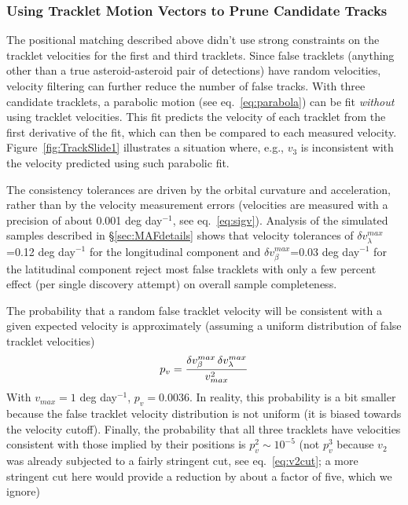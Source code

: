 
\subsubsection{Using Tracklet Motion Vectors to Prune Candidate Tracks}

The positional matching described above didn't use strong constraints on the tracklet velocities
for the first and third tracklets. Since false tracklets (anything other than a true 
asteroid-asteroid pair of detections) have random velocities, 
velocity filtering can further reduce the number of false tracks.
With three candidate tracklets, a parabolic motion (see eq.~\ref{eq:parabola}) can be fit {\it without}
using tracklet velocities. This fit predicts the velocity of each tracklet from the first derivative of
the fit, which can then be compared to each measured velocity. Figure~\ref{fig:TrackSlide1}
illustrates a situation where, e.g., $v_3$ is inconsistent with the velocity predicted using such
parabolic fit.

The consistency tolerances are driven by the orbital curvature and acceleration, rather than
by the velocity measurement errors (velocities are measured with a precision of about 0.001
deg day$^{-1}$, see eq.~\ref{eq:sigv}). Analysis of the simulated samples described in
\S\ref{sec:MAFdetails} shows that velocity tolerances of $\delta v_\lambda^{max}$=0.12 deg day$^{-1}$
for the longitudinal component and $\delta v_\beta^{max}$=0.03 deg day$^{-1}$ for the latitudinal component
reject most false tracklets with only a few percent effect (per single discovery attempt) on overall
sample completeness.

The probability that a random false tracklet velocity will be consistent with a given expected
velocity is approximately (assuming a uniform distribution of false tracklet velocities)
\begin{equation}
        p_v =  { \delta v_\beta^{max} \, \delta v_\lambda^{max} \over  v_{max}^2 }
\end{equation}
With $v_{max} = 1$ deg day$^{-1}$, $p_v = 0.0036$. In reality, this probability is a bit smaller because
the false tracklet velocity distribution is not uniform (it is biased towards the velocity cutoff).
Finally, the probability that all three tracklets have velocities consistent with those
implied by their positions is $p_v^2 \sim 10^{-5}$ (not $p_v^3$ because $v_2$ was already
subjected to a fairly stringent cut, see eq.~\ref{eq:v2cut}; a more stringent cut here
would provide a reduction by about a factor of five, which we ignore)

